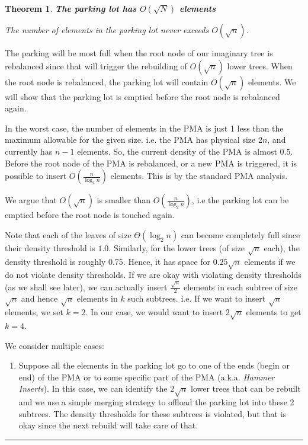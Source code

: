 \documentclass{article}
\newenvironment{proof}{{\bf Proof:  }}{\hfill\rule{2mm}{2mm}}
\newtheorem{theorem}[fact]{Theorem}
\begin{document}
\begin{theorem}
\textbf{The parking lot has $O(\sqrt{N})$ elements}

The number of elements in the parking lot never exceeds $O(\sqrt{n})$.
\end{theorem}

\begin{proof}

The parking will be most full when the root node of our imaginary tree
is rebalanced since that will trigger the rebuilding of $O(\sqrt{n})$
lower trees. When the root node is rebalanced, the parking lot will
contain $O(\sqrt{n})$ elements. We will show that the parking lot is
emptied before the root node is rebalanced again.

In the worst case, the number of elements in the PMA is just 1 less
than the maximum allowable for the given size. i.e. the PMA has
physical size $2n$, and currently has $n-1$ elements. So, the current density of the PMA is almost
$0.5$. Before the root node of the PMA is rebalanced, or a new PMA is triggered, it is possible to insert $O(\frac{n}{\log_2{n}})$ elements. This is by the standard PMA analysis.

We argue that $O(\sqrt{n})$ is smaller than  $O(\frac{n}{\log_2{n}})$, i.e the parking lot can be emptied before the root node is touched again.

Note that each of the leaves of size $\Theta(\log_2{n})$ can become completely full
since their density threshold is $1.0$.  Similarly, for the lower trees (of size $\sqrt{n}$ each), the
density threshold is roughly $0.75$. Hence, it has space for $0.25\sqrt{n}$
elements if we do not violate density thresholds. If we are okay with
violating density thresholds (as we shall see later), we can actually
insert $\frac{\sqrt{n}}{2}$ elements in each subtree of size
$\sqrt{n}$ and hence $\sqrt{n}$ elements in $k$ such subtrees. i.e. If
we want to insert $\sqrt{n}$ elements, we set $k = 2$. In our case, we
would want to insert $2\sqrt{n}$ elements to get $k = 4$. 

We consider multiple cases:

\begin{enumerate}

\item Suppose all the elements in the parking lot go to one of the
  ends (begin or end) of the PMA or to some specific part of the PMA
  (a.k.a. \textit{Hammer Inserts}). In this case, we can identify the
  $2\sqrt{n}$ lower trees that can be rebuilt and we use a simple
  merging strategy to offload the parking lot into these 2
  subtrees. The density thresholds for these subtrees is violated, but
  that is okay since the next rebuild will take care of that.


\end{enumerate}
\end{proof}
\end{document}
